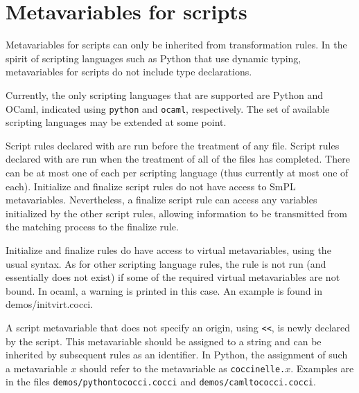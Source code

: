 \section{Metavariables for scripts}

Metavariables for scripts can only be inherited from transformation rules.
In the spirit of scripting languages such as Python that use dynamic
typing, metavariables for scripts do not include type declarations.

\begin{grammar}

    


\end{grammar}

Currently, the only scripting languages that are supported are Python and
OCaml, indicated using {\tt python} and {\tt ocaml}, respectively.  The
set of available scripting languages may be extended at some point.

Script rules declared with  are run before the treatment of
any file.  Script rules declared with  are run when the
treatment of all of the files has completed.  There can be at most one of
each per scripting language (thus currently at most one of each).
Initialize and finalize script rules do not have access to SmPL
metavariables.  Nevertheless, a finalize script rule can access any
variables initialized by the other script rules, allowing information to be
transmitted from the matching process to the finalize rule.

Initialize and finalize rules do have access to virtual metavariables,
using the usual syntax.  As for other scripting language rules, the rule
is not run (and essentially does not exist) if some of the required virtual
metavariables are not bound.  In ocaml, a warning is printed in this case.
An example is found in demos/initvirt.cocci.

A script metavariable that does not specify an origin, using \texttt{<<},
is newly declared by the script.  This metavariable should be assigned to a
string and can be inherited by subsequent rules as an identifier.  In
Python, the assignment of such a metavariable $x$ should refer to the
metavariable as {\tt coccinelle.\(x\)}.  Examples are in the files
\texttt{demos/pythontococci.cocci} and \texttt{demos/camltococci.cocci}.

